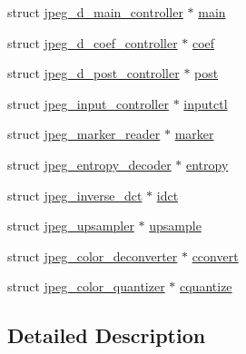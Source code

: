 \begin{DoxyCompactItemize}
\item 
struct \mbox{\hyperlink{structjpeg__d__main__controller}{jpeg\+\_\+d\+\_\+main\+\_\+controller}} $\ast$ \mbox{\hyperlink{structjpeg__decompress__struct_aab13271d039318135ee5ca434e96c34d}{main}}
\item 
struct \mbox{\hyperlink{structjpeg__d__coef__controller}{jpeg\+\_\+d\+\_\+coef\+\_\+controller}} $\ast$ \mbox{\hyperlink{structjpeg__decompress__struct_a25ff493a838c250917bf874a70bdb6f2}{coef}}
\item 
struct \mbox{\hyperlink{structjpeg__d__post__controller}{jpeg\+\_\+d\+\_\+post\+\_\+controller}} $\ast$ \mbox{\hyperlink{structjpeg__decompress__struct_aa23ccd90094cf7cf11f8f688eb28988e}{post}}
\item 
struct \mbox{\hyperlink{structjpeg__input__controller}{jpeg\+\_\+input\+\_\+controller}} $\ast$ \mbox{\hyperlink{structjpeg__decompress__struct_aba60d9f35b5b2357fd7d9b28809cb087}{inputctl}}
\item 
struct \mbox{\hyperlink{structjpeg__marker__reader}{jpeg\+\_\+marker\+\_\+reader}} $\ast$ \mbox{\hyperlink{structjpeg__decompress__struct_a59a6ada58d57b412fe89e1a531323b50}{marker}}
\item 
struct \mbox{\hyperlink{structjpeg__entropy__decoder}{jpeg\+\_\+entropy\+\_\+decoder}} $\ast$ \mbox{\hyperlink{structjpeg__decompress__struct_ac53f055b3d8103caa6c7ba4b4975eb5b}{entropy}}
\item 
struct \mbox{\hyperlink{structjpeg__inverse__dct}{jpeg\+\_\+inverse\+\_\+dct}} $\ast$ \mbox{\hyperlink{structjpeg__decompress__struct_a2ef67a2829f8ecebb1af0ed440bff8bf}{idct}}
\item 
struct \mbox{\hyperlink{structjpeg__upsampler}{jpeg\+\_\+upsampler}} $\ast$ \mbox{\hyperlink{structjpeg__decompress__struct_a80ad7e1c14488a065697b09679479c5d}{upsample}}
\item 
struct \mbox{\hyperlink{structjpeg__color__deconverter}{jpeg\+\_\+color\+\_\+deconverter}} $\ast$ \mbox{\hyperlink{structjpeg__decompress__struct_a1f88347e58f8f9d93954aa885f3497fb}{cconvert}}
\item 
struct \mbox{\hyperlink{structjpeg__color__quantizer}{jpeg\+\_\+color\+\_\+quantizer}} $\ast$ \mbox{\hyperlink{structjpeg__decompress__struct_ace3f4f51b8cf7bd24428ae9d10f5ddf1}{cquantize}}
\end{DoxyCompactItemize}


\subsection{Detailed Description}


